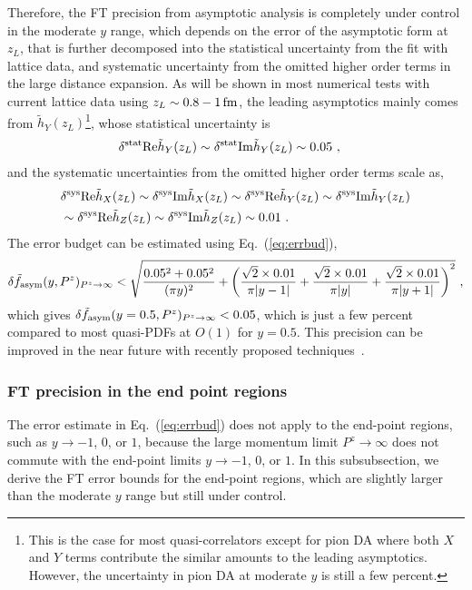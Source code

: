 \documentclass[a4paper,11pt]{article}
\begin{document}
Therefore, the FT precision from asymptotic analysis is completely under control in the moderate $y$ range, which depends on the error of the asymptotic form at $z_L$, that is further decomposed into the statistical uncertainty from the fit with lattice data, and systematic uncertainty from the omitted higher order terms in the large distance expansion. As will be shown in most numerical tests with current lattice data using $z_L \sim 0.8 - 1 \, {\rm fm}$, the leading asymptotics mainly comes from $\tilde{h}_{Y}(z_L)$\footnote{This is the case for most quasi-correlators except for pion DA where both $X$ and $Y$ terms contribute the similar amounts to the leading asymptotics. However, the uncertainty in pion DA at moderate $y$ is still a few percent.}, whose statistical uncertainty is
\begin{align}
&\delta^{\rm stat}{\rm Re}\tilde{h}_{Y}(z_L)\sim \delta^{\rm stat}{\rm Im}\tilde{h}_{Y}(z_L) \sim 0.05 \ ,
\end{align}
and the systematic uncertainties from the omitted higher order terms scale as, 
\begin{align}
&\delta^{\rm sys}{\rm Re}\tilde{h}_{X}(z_L) 
\sim \delta^{\rm sys}{\rm Im}\tilde{h}_{X}(z_L) 
\sim \delta^{\rm sys}{\rm Re}\tilde{h}_{Y}(z_L) 
\sim \delta^{\rm sys}{\rm Im}\tilde{h}_{Y}(z_L) \nonumber\\
&\sim \delta^{\rm sys}{\rm Re}\tilde{h}_{Z}(z_L) 
\sim \delta^{\rm sys}{\rm Im}\tilde{h}_{Z}(z_L) 
\sim 0.01 \ .
\end{align}
The error budget can be estimated using Eq.~(\ref{eq:errbud}),
\begin{align}
\delta \tilde f_{\rm asym}(y,P^z)_{P^z \rightarrow\infty} < \sqrt{\frac{0.05^2+0.05^2}{(\pi y)^2} + \left(\frac{\sqrt{2}\times 0.01}{\pi|y-1|}+\frac{\sqrt{2}\times 0.01}{\pi|y|}+\frac{\sqrt{2}\times 0.01}{\pi|y+1|}\right)^2} \ ,
\end{align}
which gives $\delta \tilde f_{\rm asym}(y=0.5,P^z)_{P^z \rightarrow\infty} < 0.05$, which is just a few percent compared to most quasi-PDFs at $O(1)$ for $y=0.5$. This precision can be improved in the near future with recently proposed techniques~\cite{Gao:2023lny,Zhao:2023ptv,Zhang:2025hyo}.



\subsubsection{FT precision in the end point regions}\label{sec:FTerrendpoint}
The error estimate in Eq.~(\ref{eq:errbud}) does not apply to the end-point regions, such as $y\rightarrow -1$, $0$, or $1$, because the large momentum limit $P^z \rightarrow \infty$ does not commute with the end-point limits $y\rightarrow -1$, $0$, or $1$. In this subsubsection, we derive the FT error bounds for the end-point regions, which are slightly larger than the moderate $y$ range but still under control.   
\end{document}

